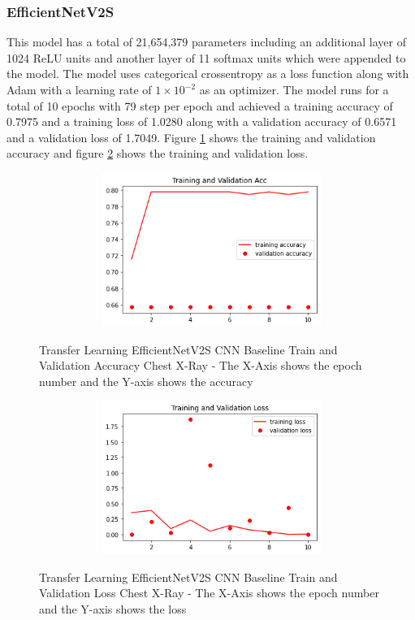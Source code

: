 \subsubsection{EfficientNetV2S}
This model has a total of 21,654,379 parameters including an additional layer of 1024 ReLU units and another layer of 11 softmax units which were appended to the model.  The model uses categorical crossentropy as a loss function along with Adam with a learning rate of $1\times 10^{-2}$ as an optimizer.  The model runs for a total of 10 epochs with 79 step per epoch and achieved a training accuracy of 0.7975 and a training loss of 1.0280 along with a validation accuracy of 0.6571 and a validation loss of 1.7049. Figure \ref{fig:EfficientNetV2S CNN Baseline Train and Validation Accuracy Chest X-Ray} shows the training and validation accuracy and figure \ref{fig:EfficientNetV2S CNN Baseline Train and Validation Loss Chest X-Ray} shows the training and validation loss.
 \begin{figure}[H]
    \centering
    \includegraphics[width=1\textwidth,height=5cm,keepaspectratio]{Images/EfficientNetV2SBaselineTrainingValidationAccuracyChestX-Ray.png}\\
    \caption{Transfer Learning EfficientNetV2S CNN Baseline Train and Validation Accuracy Chest X-Ray - The X-Axis shows the epoch number and the Y-axis shows the accuracy}
    \label{fig:EfficientNetV2S CNN Baseline Train and Validation Accuracy Chest X-Ray}
\end{figure}
 \begin{figure}[H]
    \centering
    \includegraphics[width=1\textwidth,height=5cm,keepaspectratio]{Images/EfficientNetV2SBaselineTrainingValidationLossXRayCOVID19.png}\\
    \caption{Transfer Learning EfficientNetV2S CNN Baseline Train and Validation Loss Chest X-Ray - The X-Axis shows the epoch number and the Y-axis shows the loss}
    \label{fig:EfficientNetV2S CNN Baseline Train and Validation Loss Chest X-Ray}
\end{figure}
